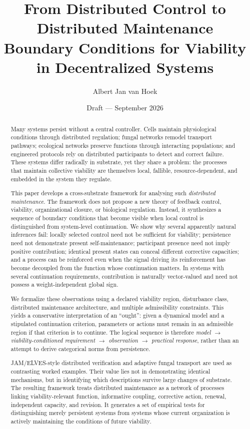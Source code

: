 \documentclass[11pt]{article}
\title{\textbf{From Distributed Control to Distributed Maintenance}\\
\large Boundary Conditions for Viability in Decentralized Systems}
\author{Albert Jan van Hoek}
\date{Draft --- September 2026}
\begin{document}
\maketitle

\begin{abstract}
Many systems persist without a central controller. Cells maintain physiological conditions through distributed regulation; fungal networks remodel transport pathways; ecological networks preserve functions through interacting populations; and engineered protocols rely on distributed participants to detect and correct failure. These systems differ radically in substrate, yet they share a problem: the processes that maintain collective viability are themselves local, fallible, resource-dependent, and embedded in the system they regulate.

This paper develops a cross-substrate framework for analysing such \emph{distributed maintenance}. The framework does not propose a new theory of feedback control, viability, organizational closure, or biological regulation. Instead, it synthesizes a sequence of boundary conditions that become visible when local control is distinguished from system-level continuation. We show why several apparently natural inferences fail: locally selected control need not be sufficient for viability; persistence need not demonstrate present self-maintenance; participant presence need not imply positive contribution; identical present states can conceal different corrective capacities; and a process can be reinforced even when the signal driving its reinforcement has become decoupled from the function whose continuation matters. In systems with several continuation requirements, contribution is naturally vector-valued and need not possess a weight-independent global sign.

We formalize these observations using a declared viability region, disturbance class, distributed maintenance architecture, and multiple admissibility constraints. This yields a conservative interpretation of an ``ought'': given a dynamical model and a stipulated continuation criterion, parameters or actions must remain in an admissible region if that criterion is to continue. The logical sequence is therefore \emph{model $\rightarrow$ viability-conditioned requirement $\rightarrow$ observation $\rightarrow$ practical response}, rather than an attempt to derive categorical norms from persistence.

JAM/ELVES-style distributed verification and adaptive fungal transport are used as contrasting worked examples. Their value lies not in demonstrating identical mechanisms, but in identifying which descriptions survive large changes of substrate. The resulting framework treats distributed maintenance as a network of processes linking viability-relevant function, informative coupling, corrective action, renewal, independent capacity, and revision. It generates a set of empirical tests for distinguishing merely persistent systems from systems whose current organization is actively maintaining the conditions of future viability.
\end{abstract}







\printbibliography
\end{document}
